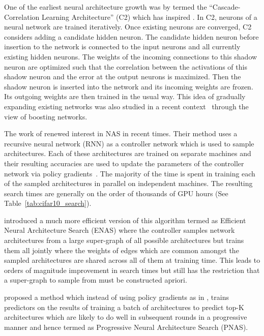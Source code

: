 One of the earliest neural architecture growth was by \cite{cascadecorr} termed the ``Cascade-Correlation Learning Architecture'' (C2) which has inspired \Petridish. 
In C2, neurons of a neural network are trained iteratively. Once existing neurons are converged, C2 considers adding a candidate hidden neuron. The candidate hidden neuron before insertion to the network is connected to the input neurons and all currently existing hidden neurons. The weights of the incoming connections to this shadow neuron are optimized such that the correlation between the activations of this shadow neuron and the error at the output neurons is maximized. Then the shadow neuron is inserted into the network and its incoming weights are frozen. Its outgoing weights are then trained in the usual way. 
This idea of gradually expanding existing networks was also studied in a recent context~\citep{adanet, boostedresnet} through the view of boosting networks. 

The work of \citep{nas,NASCell} renewed interest in NAS in recent times. Their method uses a recursive neural network (RNN) as a controller network which is used to sample architectures. Each of these architectures are trained on separate machines and their resulting accuracies are used to update the parameters of the controller network via policy gradients~\citep{policygradient}. The majority of the time is spent in training each of the sampled architectures in parallel on independent machines. The resulting search times are generally on the order of thousands of GPU hours (See Table~\ref{tab:cifar10_search}).

\cite{Pham2018EfficientNA} introduced a much more efficient version of
this algorithm termed as Efficient Neural Architecture Search (ENAS)
where the controller samples network architectures from a large
super-graph of all possible architectures but trains them all jointly
where the weights of edges which are common amongst the sampled
architectures are shared across all of them at training time. This
leads to orders of magnitude improvement in search times but still has
the restriction that a super-graph to sample from must be constructed
apriori.

\cite{Liu2017ProgressiveNA} proposed a method which instead of using
policy gradients as in \cite{NASCell}, trains predictors on the
results of training a batch of architectures to predict top-K
architectures which are likely to do well in subsequent rounds in a
progressive manner and hence termed as Progressive Neural Architecture
Search (PNAS).

